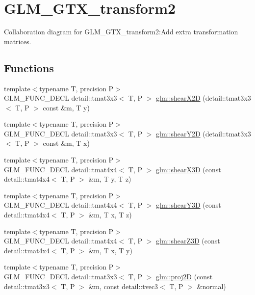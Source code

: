 \hypertarget{group__gtx__transform2}{
\section{GLM\_\-GTX\_\-transform2}
\label{group__gtx__transform2}
}


Collaboration diagram for GLM\_\-GTX\_\-transform2:Add extra transformation matrices.  
\subsection*{Functions}
\begin{CompactItemize}
\item 
{\footnotesize template$<$typename T, precision P$>$ }\\GLM\_\-FUNC\_\-DECL detail::tmat3x3$<$ T, P $>$ \hyperlink{group__gtx__transform2_gb571921ddab480d5cd402b5f3e325fb7}{glm::shearX2D} (detail::tmat3x3$<$ T, P $>$ const \&m, T y)
\item 
{\footnotesize template$<$typename T, precision P$>$ }\\GLM\_\-FUNC\_\-DECL detail::tmat3x3$<$ T, P $>$ \hyperlink{group__gtx__transform2_g17fa300cd87fdaadb7b40970d1efc515}{glm::shearY2D} (detail::tmat3x3$<$ T, P $>$ const \&m, T x)
\item 
{\footnotesize template$<$typename T, precision P$>$ }\\GLM\_\-FUNC\_\-DECL detail::tmat4x4$<$ T, P $>$ \hyperlink{group__gtx__transform2_ga091ba9f8bd59949adaf8ed5d4ec52ed}{glm::shearX3D} (const detail::tmat4x4$<$ T, P $>$ \&m, T y, T z)
\item 
{\footnotesize template$<$typename T, precision P$>$ }\\GLM\_\-FUNC\_\-DECL detail::tmat4x4$<$ T, P $>$ \hyperlink{group__gtx__transform2_g9f9bb8a5e641eb978f4ed24e980bd898}{glm::shearY3D} (const detail::tmat4x4$<$ T, P $>$ \&m, T x, T z)
\item 
{\footnotesize template$<$typename T, precision P$>$ }\\GLM\_\-FUNC\_\-DECL detail::tmat4x4$<$ T, P $>$ \hyperlink{group__gtx__transform2_ge94300dc2220af5a0d4afa13c912d1a1}{glm::shearZ3D} (const detail::tmat4x4$<$ T, P $>$ \&m, T x, T y)
\item 
{\footnotesize template$<$typename T, precision P$>$ }\\GLM\_\-FUNC\_\-DECL detail::tmat3x3$<$ T, P $>$ \hyperlink{group__gtx__transform2_gcee3ec4d06d03a1cf9f4037c4effc2e4}{glm::proj2D} (const detail::tmat3x3$<$ T, P $>$ \&m, const detail::tvec3$<$ T, P $>$ \&normal)

\end{CompactItemize}
